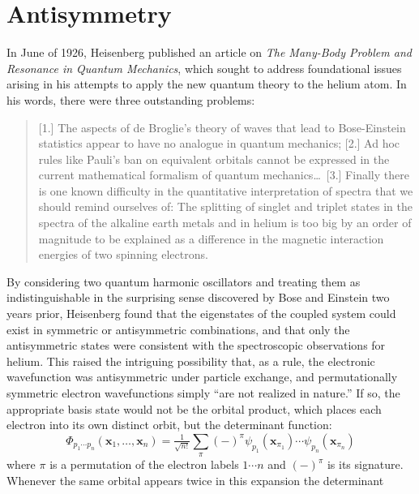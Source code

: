 \section{Antisymmetry}

In June of 1926, Heisenberg published an article on {\itshape The Many-Body
Problem and Resonance in Quantum Mechanics}, which sought to address
foundational issues arising in his attempts to apply the new quantum theory to
the helium atom.
In his words, there were three outstanding problems:
\begin{quote}
    [1.] The aspects of de Broglie's theory of waves that lead to Bose-Einstein
    statistics appear to have no analogue in quantum mechanics;
    [2.] Ad hoc rules like Pauli's ban on equivalent orbitals cannot be
    expressed in the current mathematical formalism of quantum mechanics\dots\ 
    [3.] Finally there is one known difficulty in the quantitative
    interpretation of spectra that we should remind ourselves of:
    The splitting of singlet and triplet states in the spectra of the alkaline
    earth metals and in helium is too big by an order of magnitude to be
    explained as a difference in the magnetic interaction energies of two
    spinning electrons.\cite{Heisenberg:1926p411}
\end{quote}
By considering two quantum harmonic oscillators and treating them as
indistinguishable in the surprising sense discovered by Bose\cite{Bose:1924p178}
and Einstein\cite{Einstein:1924p261} two years prior, Heisenberg found that the
eigenstates of the coupled system could exist in symmetric or antisymmetric
combinations, and that only the antisymmetric states were consistent with the
spectroscopic observations for helium.
This raised the intriguing possibility that, as a rule, the electronic
wavefunction was antisymmetric under particle exchange, and permutationally
symmetric electron wavefunctions simply ``are not realized in
nature.''\cite{Heisenberg:1926p411}
If so, the appropriate basis state would not be the orbital product, which
places each electron into its own distinct orbit, but the determinant function:
\begin{equation}
    \Phi_{p_1\cdots p_n}(\mathbf{x}_1, \ldots, \mathbf{x}_n)
    =
    \tfrac{1}{\sqrt{n!}}
    \sum_\pi
    (-)^\pi
    \psi_{p_1}(\mathbf{x}_{\pi_1})
    \cdots
    \psi_{p_n}(\mathbf{x}_{\pi_n})
\end{equation}
where \(\pi\) is a permutation of the electron labels \(1\cdots n\) and
\((-)^\pi\) is its signature.
Whenever the same orbital appears twice in this expansion the determinant

